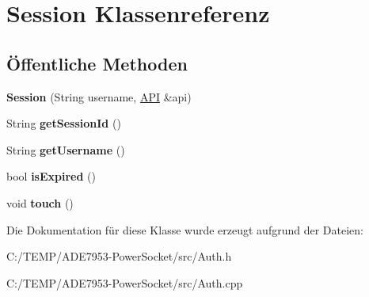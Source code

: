 \hypertarget{class_session}{}\section{Session Klassenreferenz}
\label{class_session}
\subsection*{Öffentliche Methoden}
\begin{DoxyCompactItemize}
\item 
\mbox{\label{class_session_a7f2713b9d3b5284c50fe2e1b4737afb1}} 
{\bfseries Session} (String username, \hyperlink{class_a_p_i}{A\+PI} \&api)
\item 
\mbox{\label{class_session_a8a1e5f5100ffaba505d173b76cad19a4}} 
String {\bfseries get\+Session\+Id} ()
\item 
\mbox{\label{class_session_aee582a7f3e3f09d4b7f1f7bcdb39a1b2}} 
String {\bfseries get\+Username} ()
\item 
\mbox{\label{class_session_a65cba5b1fba90e243099779ffa776a21}} 
bool {\bfseries is\+Expired} ()
\item 
\mbox{\label{class_session_aecd99d82f2905578d1492de00dcc9aa9}} 
void {\bfseries touch} ()
\end{DoxyCompactItemize}


Die Dokumentation für diese Klasse wurde erzeugt aufgrund der Dateien\+:\begin{DoxyCompactItemize}
\item 
C\+:/\+T\+E\+M\+P/\+A\+D\+E7953-\/\+Power\+Socket/src/Auth.\+h\item 
C\+:/\+T\+E\+M\+P/\+A\+D\+E7953-\/\+Power\+Socket/src/Auth.\+cpp\end{DoxyCompactItemize}

